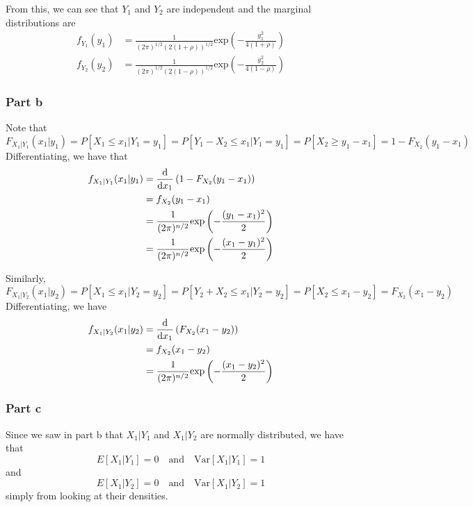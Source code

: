 \documentclass[a4paper]{article}
\begin{document}
From this, we can see that $Y_1$ and $Y_2$ are independent and the marginal distributions are
\[
  \begin{aligned}
    f_{Y_1}(y_1) &= \frac{1}{(2\pi)^{1/2} (2(1+\rho))^{1/2}} \text{exp}\left(-\frac{y_1^2}{4(1 + \rho)}\right) \\
    f_{Y_2}(y_2) &= \frac{1}{(2\pi)^{1/2} (2(1-\rho))^{1/2}} \text{exp}\left(-\frac{y_2^2}{4(1 - \rho)}\right) 
  \end{aligned}
\]

\subsubsection*{Part b}%
Note that 
\[
  F_{X_1|Y_1}(x_1|y_1) = P[X_1 \leq x_1 | Y_1 = y_1] = P[Y_1 - X_2 \leq x_1 | Y_1 = y_1] = P[X_2 \geq y_1 - x_1] = 1 - F_{X_2}(y_1 - x_1)
\]
Differentiating, we have that
\[
  \begin{aligned}
    f_{X_1|Y_1}(x_1|y_1) &= \dv{}{x_1} \left(1 - F_{X_2}(y_1 - x_1) \right)\\
                         &= f_{X_2}(y_1 - x_1) \\
                         &= \frac{1}{(2\pi)^{n/2}} \text{exp} \left( -\frac{(y_1-x_1)^2}{2} \right)\\
                         &= \frac{1}{(2\pi)^{n/2}} \text{exp} \left( -\frac{(x_1-y_1)^2}{2} \right)
  \end{aligned}
\]

Similarly,
\[
  F_{X_1|Y_2}(x_1|y_2) = P[X_1 \leq x_1 | Y_2 = y_2] = P[Y_2 + X_2 \leq x_1 | Y_2 = y_2] = P[X_2 \leq x_1 - y_2] = F_{X_2}(x_1 - y_2)
\]
Differentiating, we have
\[
  \begin{aligned}
  f_{X_1|Y_2}(x_1|y_2) &= \dv{}{x_1} \left(F_{X_2}(x_1 - y_2)\right)\\
                       &= f_{X_2}(x_1 - y_2) \\
                       &= \frac{1}{(2\pi)^{n/2}} \text{exp} \left( -\frac{(x_1-y_2)^2}{2} \right)
  \end{aligned}
\]

\subsubsection*{Part c}%
Since we saw in part b that $X_1|Y_1$ and $X_1|Y_2$ are normally distributed, we have that
\[
  E[X_1|Y_1] = 0 \quad \text{and} \quad \text{Var}[X_1|Y_1] = 1
\]
and
\[
  E[X_1|Y_2] = 0 \quad \text{and} \quad \text{Var}[X_1|Y_2] = 1
\]
simply from looking at their densities.
\end{document}
